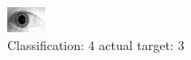 \begin{figure}[h!]
\begin{center}
\includegraphics[width=0.60\columnwidth]{figures/ID1811_class_4_target_3.png}
\end{center}
\caption{ Classification: 4 actual target: 3}
\label{fig:ID1811_class_4_target_3}
\end{figure}
